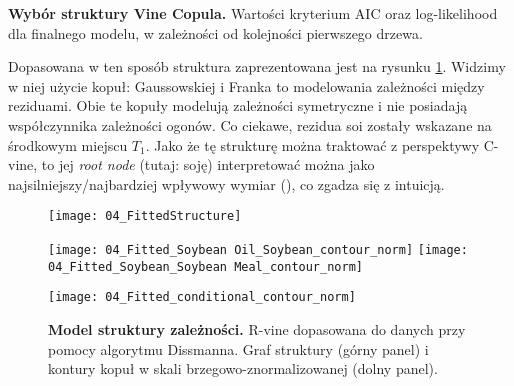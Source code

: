 \begin{table}
	\centering
	
	\caption{\textbf{Wybór struktury Vine Copula.} Wartości kryterium AIC oraz log-likelihood dla finalnego modelu, w zależności od kolejności pierwszego drzewa. \label{tab:vine_selection}}
\end{table}

Dopasowana w ten sposób struktura zaprezentowana jest na rysunku \ref{fig:vine_fit}. Widzimy w niej użycie kopuł: Gaussowskiej i Franka to modelowania zależności między reziduami. Obie te kopuły modelują zależności symetryczne i nie posiadają współczynnika zależności ogonów. Co ciekawe, rezidua soi zostały wskazane na środkowym miejscu $T_1$. Jako że tę strukturę można traktować z perspektywy C-vine, to jej \emph{root node} (tutaj: soję) interpretować można jako najsilniejszy/najbardziej wpływowy wymiar (\cite{Czado_Vine_Copulas}), co zgadza się z intuicją.\\

\begin{figure}[h]
	\centering
	\texttt{[image: 04\_FittedStructure]}
	\medskip
	\begin{minipage}{\linewidth}
		\texttt{[image: 04\_Fitted\_Soybean Oil\_Soybean\_contour\_norm]}
		\texttt{[image: 04\_Fitted\_Soybean\_Soybean Meal\_contour\_norm]}
	\end{minipage}
	\begin{minipage}{\linewidth}
		\centering
		\texttt{[image: 04\_Fitted\_conditional\_contour\_norm]}
	\end{minipage}
	\caption{\textbf{Model struktury zależności.} R-vine dopasowana do danych przy pomocy algorytmu Dissmanna. Graf struktury (górny panel) i kontury kopuł w skali brzegowo-znormalizowanej (dolny panel). \label{fig:vine_fit}}
\end{figure}
\FloatBarrier